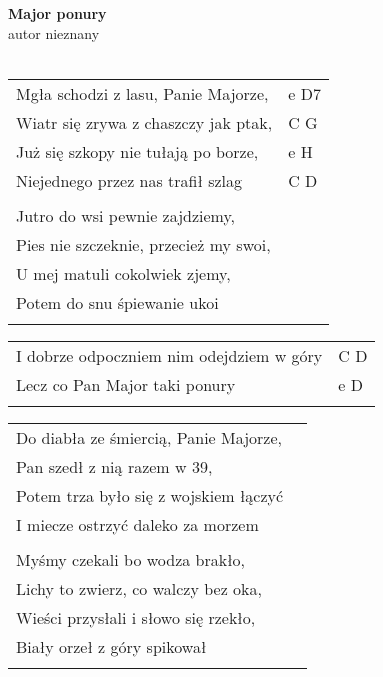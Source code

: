 \documentclass[a5paper]{article}
\begin{document}


\noindent
\fontsize{12pt}{15pt}\selectfont
\textbf{Major ponury} \\
\fontsize{8pt}{10pt}\selectfont
autor nieznany \\ \\
\fontsize{10pt}{12pt}\selectfont
{}
\begin{tabular}{@{}p{8.50cm}p{3cm}@{}}
\noindent
Mgła schodzi z lasu, Panie Majorze, & e D7 \\
Wiatr się zrywa z chaszczy jak ptak, & C G \\
Już się szkopy nie tułają po borze, & e H \\
Niejednego przez nas trafił szlag & C D \\ \\

Jutro do wsi pewnie zajdziemy,\\
Pies nie szczeknie, przecież my swoi,\\
U mej matuli cokolwiek zjemy,\\
Potem do snu śpiewanie ukoi\\ \\
\end{tabular}

\noindent
\begin{tabular}{@{}p{7.50cm}p{3cm}@{}}
I dobrze odpoczniem nim odejdziem w góry & C D \\
Lecz co Pan Major taki ponury & e D \\ \\
\end{tabular}

\noindent
\begin{tabular}{@{}p{7.50cm}p{3cm}@{}}
Do diabła ze śmiercią, Panie Majorze, \\
Pan szedł z nią razem w 39,\\
Potem trza było się z wojskiem łączyć\\
I miecze ostrzyć daleko za morzem\\\\

Myśmy czekali bo wodza brakło,\\
Lichy to zwierz, co walczy bez oka,\\
Wieści przysłali i słowo się rzekło,\\
Biały orzeł z góry spikował\\\\
\end{tabular}
\end{document}
